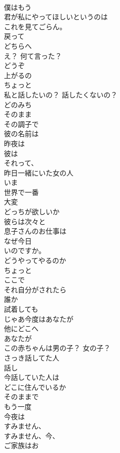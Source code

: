 \documentclass[8pt]{extreport}
\begin{document}
\begin{CJK}{UTF8}{min}
\\	僕はもう
\\	君が私にやってほしいというのは
\\	これを見てごらん。	
\\	戻って
\\	どちらへ
\\	え？ 何て言った？	
\\	どうぞ
\\	上がるの
\\	ちょっと
\\	私と話したいの？ 話したくないの？	
\\	どのみち
\\	そのまま
\\	その調子で
\\	彼の名前は
\\	昨夜は
\\	彼は
\\	それって、
\\	昨日一緒にいた女の人
\\	いま
\\	世界で一番
\\	大変
\\	どっちが欲しいか
\\	彼らは次々と
\\	息子さんのお仕事は
\\	なぜ今日
\\	いのですか。	
\\	どうやってやるのか
\\	ちょっと
\\	ここで
\\	それ自分がされたら
\\	誰か
\\	試着しても
\\	じゃあ今度はあなたが
\\	他にどこへ
\\	あなたが
\\	この赤ちゃんは男の子？ 女の子？	
\\	さっき話してた人
\\	話し
\\	今話していた人は
\\	どこに住んでいるか
\\	そのままで
\\	もう一度
\\	今夜は
\\	すみません、
\\	すみません、今、
\\	ご家族はお

\end{CJK}
\end{document}
